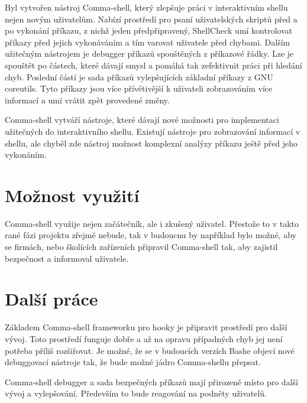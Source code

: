 \documentclass[thesis=M,czech]{FITthesis}[2012/06/26]
\begin{document}
%
%
\begin{conclusion}

Byl vytvořen nástroj Comma-shell, který zlepšuje práci v interaktivním shellu nejen novým uživatelům. Nabízí prostředí pro psaní uživatelských skriptů před a po vykonání příkazu, z nichž jeden předpřipravený, ShellCheck umí kontrolovat příkazy před jejich vykonáváním a tím varovat uživatele před chybami. Dalším užitečným nástrojem je debugger příkazů spouštěných z příkazové řádky. Lze je spouštět po částech, které dávají smysl a pomáhá tak zefektivnit práci při hledání chyb. Poslední částí je sada příkazů vylepšujících základní příkazy z GNU coreutils. Tyto příkazy jsou více přívětivější k uživateli zobrazováním více informací a umí vrátit zpět provedené změny.

Comma-shell vytváří nástroje, které dávají nové možnosti pro implementaci užitečných do interaktivního shellu. Existují nástroje pro zobrazování informací v shellu, ale chyběl zde nástroj možnost komplexní analýzy příkazu ještě před jeho vykonáním.


\section{Možnost využití}

Comma-shell využije nejen začátečník, ale i zkušený uživatel. Přestože to v takto rané fázi projektu zřejmě nebude, tak v budoucnu by například bylo možné, aby se firmách, nebo školících zařízeních připravil Comma-shell tak, aby zajistil bezpečnost a informoval uživatele.


\section{Další práce}

Základem Comma-shell frameworku pro hooky je připravit prostředí pro další vývoj. Toto prostředí funguje dobře a až na opravu případných chyb jej není potřeba příliš rozšiřovat. Je možné, že se v budoucích verzích Bashe objeví nové debuggovací nástroje tak, že bude možné jádro Comma-shellu přepsat.

Comma-shell debugger a sada bezpečných příkazů mají přirozeně místo pro další vývoj a vylepšování. Především to bude reagování na podněty uživatelů.


\end{conclusion}
\end{document}
